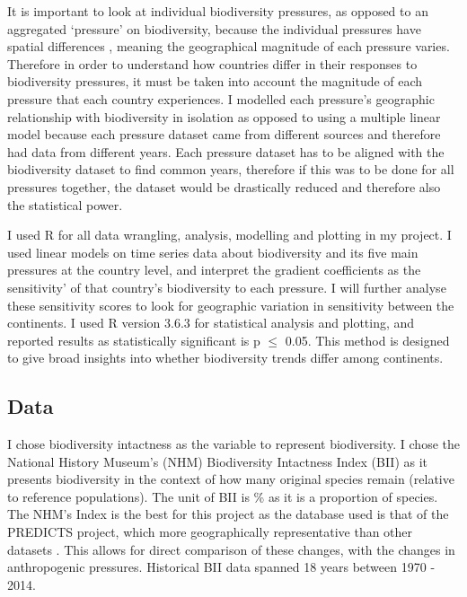 \documentclass[11pt, a4paper, titlepage]{article}
\begin{document}
	It is important to look at individual biodiversity pressures, as opposed to an aggregated `pressure' on biodiversity, because the individual pressures have spatial differences \citep{steffen2015planetary}, meaning the geographical magnitude of each pressure varies. Therefore in order to understand how countries differ in their responses to biodiversity pressures, it must be taken into account the magnitude of each pressure that each country experiences. I modelled each pressure's geographic relationship with biodiversity in isolation as opposed to using a multiple linear model because each pressure dataset came from different sources and therefore had data from different years. Each pressure dataset has to be aligned with the biodiversity dataset to find common years, therefore if this was to be done for all pressures together, the dataset would be drastically reduced and therefore also the statistical power.
	
	I used R for all data wrangling, analysis, modelling and plotting in my project. I used linear models on time series data about biodiversity and its five main pressures at the country level, and interpret the gradient coefficients as the sensitivity' of that country's biodiversity to each pressure. I will further analyse these sensitivity scores to look for geographic variation in sensitivity between the continents. I used R version 3.6.3 for statistical analysis and plotting, and reported results as statistically significant is p $\leq$ 0.05. This method is designed to give broad insights into whether biodiversity trends differ among continents. \newline
	\subsection*{Data}
	I chose biodiversity intactness as the variable to represent biodiversity. I chose the National History Museum's (NHM) Biodiversity Intactness Index (BII)\citep{phillips2021} as it presents biodiversity in the context of how many original species remain (relative to reference populations). The unit of BII is \% as it is a proportion of species. The NHM's Index is the best for this project as the database used is that of the PREDICTS project, which more geographically representative than other datasets \citep{purvis2018modelling}. This allows for direct comparison of these changes, with the changes in anthropogenic pressures. Historical BII data spanned 18 years between 1970 - 2014. 
	
\end{document}
